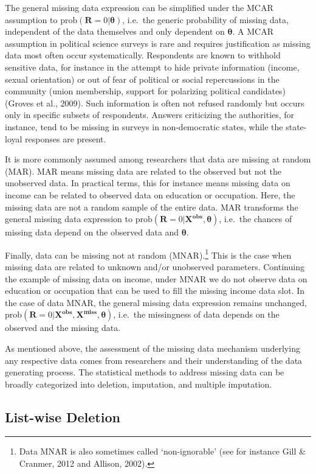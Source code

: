 \documentclass[12pt,econ]{sources/authesis}
\begin{document}
The general missing data expression can be simplified under the MCAR assumption to \(\text{prob}(\bm{R} = 0 | \bm{\theta})\), i.e.~the generic probability of missing data, independent of the data themselves and only dependent on \(\bm{\theta}\). A MCAR assumption in political science surveys is rare and requires justification as missing data most often occur systematically. Respondents are known to withhold sensitive data, for instance in the attempt to hide private information (income, sexual orientation) or out of fear of political or social repercussions in the community (union membership, support for polarizing political candidates) (Groves et al., 2009). Such information is often not refused randomly but occurs only in specific subsets of respondents. Answers criticizing the authorities, for instance, tend to be missing in surveys in non-democratic states, while the state-loyal responses are present.

It is more commonly assumed among researchers that data are missing at random (MAR). MAR means missing data are related to the observed but not the unobserved data. In practical terms, this for instance means missing data on income can be related to observed data on education or occupation. Here, the missing data are not a random sample of the entire data. MAR transforms the general missing data expression to \(\text{prob}(\bm{R} = 0 | \bm{X^{obs}}, \bm{\theta})\), i.e.~the chances of missing data depend on the observed data and \(\bm{\theta}\).

Finally, data can be missing not at random (MNAR).\footnote{Data MNAR is also sometimes called `non-ignorable' (see for instance Gill \& Cranmer, 2012 and Allison, 2002).} This is the case when missing data are related to unknown and/or unobserved parameters. Continuing the example of missing data on income, under MNAR we do not observe data on education or occupation that can be used to fill the missing income data slot. In the case of data MNAR, the general missing data expression remains unchanged, \(\text{prob}(\bm{R} = 0 | \bm{X^{obs}}, \bm{X^{miss}}, \bm{\theta})\), i.e.~the missingness of data depends on the observed and the missing data.

As mentioned above, the assessment of the missing data mechanism underlying any respective data comes from researchers and their understanding of the data generating process. The statistical methods to address missing data can be broadly categorized into deletion, imputation, and multiple imputation.

\hypertarget{ordmiss-theory-delete}{%
\subsection{List-wise Deletion}\label{ordmiss-theory-delete}}
\end{document}
